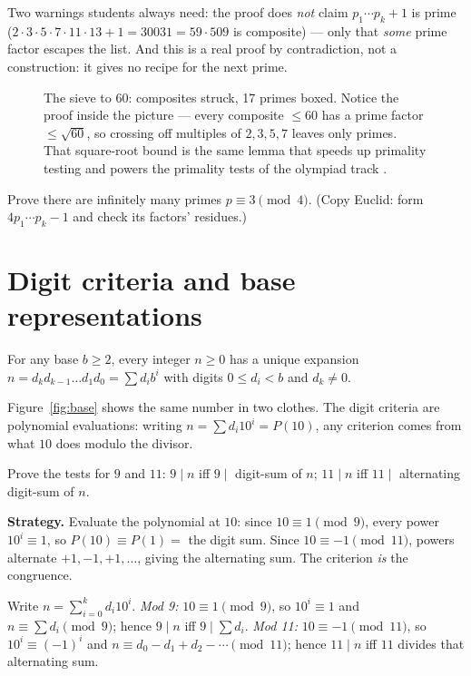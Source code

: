 Two warnings students always need: the proof does \emph{not} claim
$p_1\cdots p_k + 1$ is prime ($2\cdot3\cdot5\cdot7\cdot11\cdot13 + 1 =
30031 = 59\cdot509$ is composite) --- only that \emph{some} prime factor
escapes the list. And this is a real proof by contradiction, not a
construction: it gives no recipe for the next prime.

\begin{figure}[ht]\centering

\caption{The sieve to $60$: composites struck, 17 primes boxed. Notice the
proof inside the picture --- every composite $\le 60$ has a prime factor
$\le\sqrt{60}$, so crossing off multiples of $2,3,5,7$ leaves only primes.
That square-root bound is the same lemma that speeds up primality testing
and powers the primality tests of the olympiad track \cite{zhao}.}
\label{fig:sieve}
\end{figure}

\begin{exercise}[medium]\label{exr:inf2}
Prove there are infinitely many primes $p \equiv 3 \pmod 4$. (Copy Euclid:
form $4p_1\cdots p_k - 1$ and check its factors' residues.)
\end{exercise}

\section{Digit criteria and base representations}\label{sec:digits}

\begin{theorem}
For any base $b \ge 2$, every integer $n \ge 0$ has a unique expansion
$n = d_k d_{k-1}\dots d_1 d_0 = \sum d_i b^i$ with digits
$0 \le d_i < b$ and $d_k \ne 0$.
\end{theorem}

Figure~\ref{fig:base} shows the same number in two clothes. The digit
criteria are polynomial evaluations: writing
$n = \sum d_i 10^i = P(10)$, any criterion comes from what $10$ does modulo
the divisor.

\begin{example}\label{ex:digitrules}
Prove the tests for $9$ and $11$: $9 \mid n$ iff $9 \mid$ digit-sum of $n$;
$11 \mid n$ iff $11 \mid$ alternating digit-sum of $n$.
\par\smallskip
\textbf{Strategy.} Evaluate the polynomial at $10$: since $10 \equiv 1
\pmod 9$, every power $10^i \equiv 1$, so $P(10) \equiv P(1) = $ the digit
sum. Since $10 \equiv -1 \pmod{11}$, powers alternate $+1, -1, +1, \dots$,
giving the alternating sum. The criterion \emph{is} the congruence.
\par\smallskip
\begin{solution}
Write $n = \sum_{i=0}^{k} d_i 10^i$.
\emph{Mod 9:} $10 \equiv 1 \pmod 9$, so $10^i \equiv 1$ and
$n \equiv \sum d_i \pmod 9$; hence $9 \mid n$ iff $9 \mid \sum d_i$.
\emph{Mod 11:} $10 \equiv -1 \pmod{11}$, so $10^i \equiv (-1)^i$ and
$n \equiv d_0 - d_1 + d_2 - \cdots \pmod{11}$; hence $11 \mid n$ iff $11$
divides that alternating sum.
\end{solution}
\end{example}

